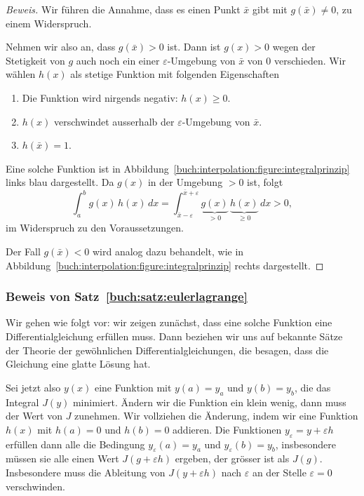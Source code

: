 \begin{proof}[Beweis]
Wir führen die Annahme, dass es einen Punkt $\bar{x}$ gibt mit
$g(\bar{x})\ne 0$, zu einem Widerspruch.
%

Nehmen wir also an, dass $g(\bar{x})>0$ ist.
Dann ist $g(x)>0$ wegen der Stetigkeit von $g$ auch noch ein einer
$\varepsilon$-Umgebung von $\bar{x}$ von $0$ verschieden.
Wir wählen $h(x)$ als stetige Funktion mit folgenden Eigenschaften
\begin{enumerate}
\item
Die Funktion wird nirgends negativ: $h(x)\ge 0$.
\item
$h(x)$ verschwindet ausserhalb der $\varepsilon$-Umgebung von $\bar{x}$.
\item
$h(\bar{x})=1$.
\end{enumerate}
Eine solche Funktion ist in
Abbildung~\ref{buch:interpolation:figure:integralprinzip} links
blau dargestellt.
Da $g(x)$ in der Umgebung $>0$ ist, folgt
\[
\int_a^b g(x)\,h(x)\,dx
=
\int_{\bar{x}-\varepsilon}^{\bar{x}+\varepsilon}
\underbrace{g(x)}_{\displaystyle>0}\,\underbrace{h(x)}_{\displaystyle\ge 0}\,dx
>
0,
\]
im Widerspruch zu den Voraussetzungen.

Der Fall $g(\bar{x})<0$ wird analog dazu behandelt, wie in
Abbildung~\ref{buch:interpolation:figure:integralprinzip} rechts
dargestellt.
\end{proof}

\subsubsection{Beweis von Satz~\ref{buch:satz:eulerlagrange}}
Wir gehen wie folgt vor: wir zeigen zunächst, dass eine solche Funktion
eine Differentialgleichung erfüllen muss.
Dann beziehen wir uns auf bekannte Sätze der Theorie der gewöhnlichen
Differentialgleichungen, die besagen, dass die Gleichung eine glatte 
Lösung hat.

Sei jetzt also $y(x)$ eine Funktion mit $y(a)=y_a$ und $y(b)=y_b$, die
das Integral $J(y)$ minimiert.
Ändern wir die Funktion ein klein wenig, dann muss der Wert von $J$ zunehmen.
Wir vollziehen die Änderung, indem wir eine Funktion $h(x)$
mit $h(a)=0$ und $h(b)=0$ addieren.
Die Funktionen $y_\varepsilon= y+\varepsilon h$ erfüllen dann alle die
Bedingung $y_\varepsilon(a)=y_a$ und $y_\varepsilon(b)=y_b$, insbesondere
müssen sie alle einen Wert $J(g+\varepsilon h)$ ergeben, der grösser ist
als $J(g)$.
Insbesondere muss die Ableitung von $J(y+\varepsilon h)$ nach $\varepsilon$
an der Stelle $\varepsilon=0$ verschwinden.

